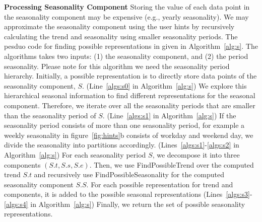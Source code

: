 \documentclass[10pt,conference,letterpaper]{IEEEtran}
\begin{document}
{\bf  Processing Seasonality Component}
\label{sec:seasonal}
Storing the value of each data point in the seasonality component may be expensive (e.g., yearly seasonality).  We may approximate the seasonality component using the user hints by 
recursively calculating the trend and seasonality using smaller seasonality periods. 
The pesduo code for finding possible representations in given in Algorithm~\ref{alg:s}. The algorithms takes two inputs: (1) the seasonality component, and (2) the period seasonality. Please note for this algorithm we need the seasonality  period hierarchy.
Initially, a possible representation is to directly store  data points  of the seasonality component, $S$. (Line~\ref{algs:s0} in Algorithm~\ref{alg:s})
We explore this hierarchical seasonal information to find different representations for the seasonal component. Therefore, we iterate over all the seasonality periods that are smaller than the seasonality period of $S$.
(Line~\ref{algs:s1} in Algorithm~\ref{alg:s})
If the seasonality period consists of  more  than one seasonality period,  for example a weekly seasonality in  figure~\ref{fig:hints}b consists of workday and weekend day, we divide the seasonality into partitions accordingly. (Lines~\ref{algs:s1}-\ref{algs:s2} in Algorithm~\ref{alg:s}) For each seasonality period $S$, we decompose it into three components $(S.t,S.s,S.e)$. Then,  we use FindPossibleTrend over the computed trend $S.t$ and recursively use FindPossibleSeasonality for the computed seasonality component $S.S$. For each possible representation for trend and components, it is added to the possible seasonal representations  (Lines~\ref{algs:s3}-\ref{algs:s4} in Algorithm~\ref{alg:s}) Finally, we return the set of possible seasonality representations. 
 

\end{document}
